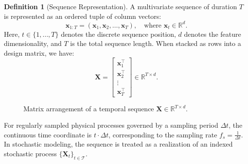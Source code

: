 \documentclass[11pt,a4paper]{article}
\theoremstyle{definition}
\newtheorem{definition}{Definition}[section]
\theoremstyle{plain}
\begin{document}
\begin{definition}[Sequence Representation]
A multivariate sequence of duration $T$ is represented as an ordered tuple of column vectors:
\begin{equation}
    \mathbf{x}_{1:T} = (\mathbf{x}_1, \mathbf{x}_2, \dots, \mathbf{x}_T), \quad \text{where } \mathbf{x}_t \in \mathbb{R}^d.
\end{equation}
Here, $t \in \{1, \dots, T\}$ denotes the discrete sequence position, $d$ denotes the feature dimensionality, and $T$ is the total sequence length. When stacked as rows into a design matrix, we have:
\begin{equation}
    \mathbf{X} = \begin{bmatrix} \mathbf{x}_1^\top \\ \mathbf{x}_2^\top \\ \vdots \\ \mathbf{x}_T^\top \end{bmatrix} \in \mathbb{R}^{T \times d}.
\end{equation}
\end{definition}

\begin{figure}[htbp]
\centering
{}
\caption{Matrix arrangement of a temporal sequence $\mathbf{X} \in \mathbb{R}^{T \times d}$.}
\end{figure}

For regularly sampled physical processes governed by a sampling period $\Delta t$, the continuous time coordinate is $t \cdot \Delta t$, corresponding to the sampling rate $f_s = \frac{1}{\Delta t}$. In stochastic modeling, the sequence is treated as a realization of an indexed stochastic process $\{\mathbf{X}_t\}_{t \in \mathcal{T}}$.
\end{document}
